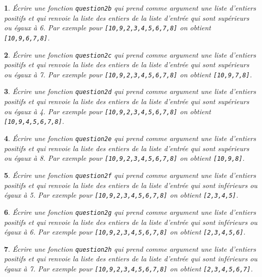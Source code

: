 \documentclass[10pt]{article}
\newtheorem{exi}{}
\newenvironment{exo}{\begin{exi}\em}{\end{exi}}
\begin{document}
\vspace*{-2ex}
\begin{exo}
    Écrire une fonction {\tt question2b} qui prend comme argument une liste d'entiers positifs et qui renvoie la liste des entiers de la liste d'entrée qui sont
supérieurs ou égaux à 6. Par exemple pour \verb+[10,9,2,3,4,5,6,7,8]+
on obtient \verb+[10,9,6,7,8]+.
\end{exo}
\vspace*{-2ex}
\begin{exo}
    Écrire une fonction {\tt question2c} qui prend comme argument une liste d'entiers positifs et qui renvoie la liste des entiers de la liste d'entrée qui sont
supérieurs ou égaux à 7. Par exemple pour \verb+[10,9,2,3,4,5,6,7,8]+
on obtient \verb+[10,9,7,8]+.
\end{exo}
\vspace*{-2ex}
\begin{exo}
    Écrire une fonction {\tt question2d} qui prend comme argument une liste d'entiers positifs et qui renvoie la liste des entiers de la liste d'entrée qui sont
supérieurs ou égaux à 4. Par exemple pour \verb+[10,9,2,3,4,5,6,7,8]+
on obtient \verb+[10,9,4,5,6,7,8]+.
\end{exo}
\vspace*{-2ex}
\begin{exo}
    Écrire une fonction {\tt question2e} qui prend comme argument une liste d'entiers positifs et qui renvoie la liste des entiers de la liste d'entrée qui sont
supérieurs ou égaux à 8. Par exemple pour \verb+[10,9,2,3,4,5,6,7,8]+
on obtient \verb+[10,9,8]+.
\end{exo}
\vspace*{-2ex}
\begin{exo}
    Écrire une fonction {\tt question2f} qui prend comme argument une liste d'entiers positifs et qui renvoie la liste des entiers de la liste d'entrée qui sont
inférieurs ou égaux à 5. Par exemple pour \verb+[10,9,2,3,4,5,6,7,8]+
on obtient \verb+[2,3,4,5]+.
\end{exo}
\vspace*{-2ex}
\begin{exo}
    Écrire une fonction {\tt question2g} qui prend comme argument une liste d'entiers positifs et qui renvoie la liste des entiers de la liste d'entrée qui sont
inférieurs ou égaux à 6. Par exemple pour \verb+[10,9,2,3,4,5,6,7,8]+
on obtient \verb+[2,3,4,5,6]+.
\end{exo}
\vspace*{-2ex}
\begin{exo}
    Écrire une fonction {\tt question2h} qui prend comme argument une liste d'entiers positifs et qui renvoie la liste des entiers de la liste d'entrée qui sont
inférieurs ou égaux à 7. Par exemple pour \verb+[10,9,2,3,4,5,6,7,8]+
on obtient \verb+[2,3,4,5,6,7]+.
\end{exo}
\end{document}
